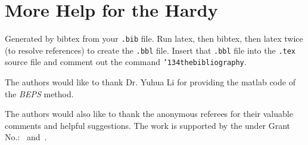 \documentclass[sigconf]{acmart}
\begin{document}

\section{More Help for the Hardy}
\appendix


Generated by bibtex from your \texttt{.bib} file.  Run latex, then
bibtex, then latex twice (to resolve references) to create the
\texttt{.bbl} file.  Insert that \texttt{.bbl} file into the
\texttt{.tex} source file and comment out the command
\texttt{{\char'134}thebibliography}.



\begin{acks}

  The authors would like to thank Dr. Yuhua Li for providing the
  matlab code of the \textit{BEPS} method.

  The authors would also like to thank the anonymous referees for
  their valuable comments and helpful suggestions. The work is
  supported by the  under Grant
  No.:~
  and~.

\end{acks}


 
\end{document}
